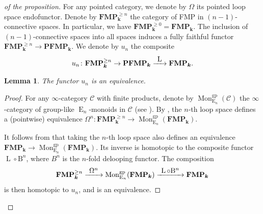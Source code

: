 \documentclass[11pt]{article}
\let\mathcal\mathscr
\newcommand{\To}[1]{\mathchoice{\xrightarrow{\textstyle\kern4pt#1\kern3pt}}{\stackrel{#1}{\longrightarrow}}{}{}}
\newtheorem{lem}[thm]{Lemma}
\theoremstyle{definition}
\newcommand{\Cc}{\mathcal{C}}
\DeclareMathOperator{\E}{E}
\newcommand{\B}{\mathrm{B}}
\newcommand{\FMP}{\mathbf{FMP}}
\renewcommand{\k}{{\boldsymbol{k}}}
\newcommand{\form}{\operatorname{L}}
\newcommand{\PFMP}{\mathbf{PFMP}}
\begin{document}
\begin{proof}[of the proposition]
For any pointed category, we denote by $\Omega$ its pointed loop space endofunctor.
Denote by $\FMP_\k^{\geq n}$ the category of FMP in $(n-1)$-connective spaces. In particular, we have $\FMP_\k^{\geq 0} = \FMP_\k$.
The inclusion of $(n-1)$-connective spaces into all spaces induces a fully faithful functor $\FMP_\k^{\geq n} \to \PFMP_\k$. We denote by $u_n$ the composite
\[
u_n \colon \FMP_\k^{\geq n} \to \PFMP_\k \To\form \FMP_\k.
\]
\begin{lem}
The functor $u_n$ is an equivalence.
\end{lem}
\begin{proof}
For any $\infty$-category $\Cc$ with finite products, denote by $\operatorname{Mon}_{\E_n}^\mathrm{gp}(\Cc)$ the $\infty$-category of group-like $\E_n$-monoids in $\Cc$ (see \cite[Def.\,5.2.6.6]{lurie:halg}). By \cite[Th.\,5.2.6.10]{lurie:halg}, the $n$-th loop space defines a (pointwise) equivalence $\Omega^n \colon \FMP_\k^{\geq n} \to \operatorname{Mon}_{\E_n}^\mathrm{gp}(\FMP_\k)$.

It follows from \cite[Prop.\,2.15]{blanckatzarkovpandit} that taking the $n$-th loop space also defines an equivalence $\FMP_\k \to \operatorname{Mon}_{\E_n}^\mathrm{gp}(\FMP_\k)$. Its inverse is homotopic to the composite functor $\form \circ \B^n$, where $B^n$ is the $n$-fold delooping functor.
The composition
\[
\FMP_\k^{\geq n} \To{\Omega^n} \operatorname{Mon}_{\E_n}^\mathrm{gp}(\FMP_\k) \To{\form \circ \B^n} \FMP_\k
\]
is then homotopic to $u_n$, and is an equivalence.
\end{proof}


\end{proof}
\end{document}
